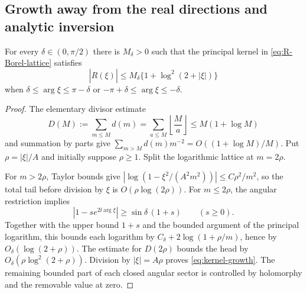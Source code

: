 \subsection{Growth away from the real directions and analytic inversion}

\begin{lemma}
\label{lem:kernel-growth}
For every $\delta\in(0,\pi/2)$ there is $M_\delta>0$ such that the principal
kernel in \eqref{eq:R-Borel-lattice} satisfies
\begin{equation}\label{eq:kernel-growth}
 |\widehat R(\xi)|
 \le M_\delta\{1+\log^2(2+|\xi|)\}
\end{equation}
when $\delta\le\arg\xi\le\pi-\delta$ or
$-\pi+\delta\le\arg\xi\le-\delta$.
\end{lemma}
\begin{proof}
The elementary divisor estimate
\[
 D(M):=\sum_{m\le M}d(m)
       =\sum_{a\le M}\left\lfloor\frac Ma\right\rfloor
       \le M(1+\log M)
\]
and summation by parts give
$\sum_{m>M}d(m)m^{-2}=O((1+\log M)/M)$.
Put $\rho=|\xi|/A$ and initially suppose $\rho\ge1$.
Split the logarithmic lattice at $m=2\rho$.

For $m>2\rho$, Taylor bounds give
$|\log(1-\xi^2/(A^2m^2))|\le C\rho^2/m^2$, so the total tail before
division by $\xi$ is $O(\rho\log(2\rho))$.
For $m\le2\rho$, the angular restriction implies
\[
 |1-s e^{2\ii\arg\xi}|
       \ge \sin\delta\,(1+s)\qquad(s\ge0).
\]
Together with the upper bound $1+s$ and the bounded argument of the
principal logarithm, this bounds each logarithm by
$C_\delta+2\log(1+\rho/m)$, hence by $O_\delta(\log(2+\rho))$.
The estimate for $D(2\rho)$ bounds the head by
$O_\delta(\rho\log^2(2+\rho))$.
Division by $|\xi|=A\rho$ proves \eqref{eq:kernel-growth}.
The remaining bounded part of each closed angular sector is controlled
by holomorphy and the removable value at zero.
\end{proof}

